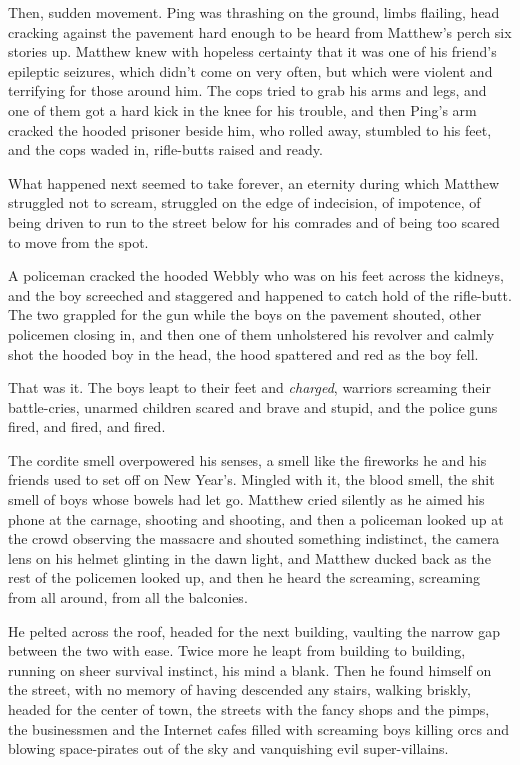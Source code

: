 Then, sudden movement. Ping was thrashing on the ground, limbs
flailing, head cracking against the pavement hard enough to be
heard from Matthew's perch six stories up. Matthew knew with
hopeless certainty that it was one of his friend's epileptic
seizures, which didn't come on very often, but which were violent
and terrifying for those around him. The cops tried to grab his
arms and legs, and one of them got a hard kick in the knee for his
trouble, and then Ping's arm cracked the hooded prisoner beside
him, who rolled away, stumbled to his feet, and the cops waded in,
rifle-butts raised and ready.

What happened next seemed to take forever, an eternity during which
Matthew struggled not to scream, struggled on the edge of
indecision, of impotence, of being driven to run to the street
below for his comrades and of being too scared to move from the
spot.

A policeman cracked the hooded Webbly who was on his feet across
the kidneys, and the boy screeched and staggered and happened to
catch hold of the rifle-butt. The two grappled for the gun while
the boys on the pavement shouted, other policemen closing in, and
then one of them unholstered his revolver and calmly shot the
hooded boy in the head, the hood spattered and red as the boy
fell.

That was it. The boys leapt to their feet and \emph{charged},
warriors screaming their battle-cries, unarmed children scared and
brave and stupid, and the police guns fired, and fired, and fired.

The cordite smell overpowered his senses, a smell like the
fireworks he and his friends used to set off on New Year's. Mingled
with it, the blood smell, the shit smell of boys whose bowels had
let go. Matthew cried silently as he aimed his phone at the
carnage, shooting and shooting, and then a policeman looked up at
the crowd observing the massacre and shouted something indistinct,
the camera lens on his helmet glinting in the dawn light, and
Matthew ducked back as the rest of the policemen looked up, and
then he heard the screaming, screaming from all around, from all
the balconies.

He pelted across the roof, headed for the next building, vaulting
the narrow gap between the two with ease. Twice more he leapt from
building to building, running on sheer survival instinct, his mind
a blank. Then he found himself on the street, with no memory of
having descended any stairs, walking briskly, headed for the center
of town, the streets with the fancy shops and the pimps, the
businessmen and the Internet cafes filled with screaming boys
killing orcs and blowing space-pirates out of the sky and
vanquishing evil super-villains.

